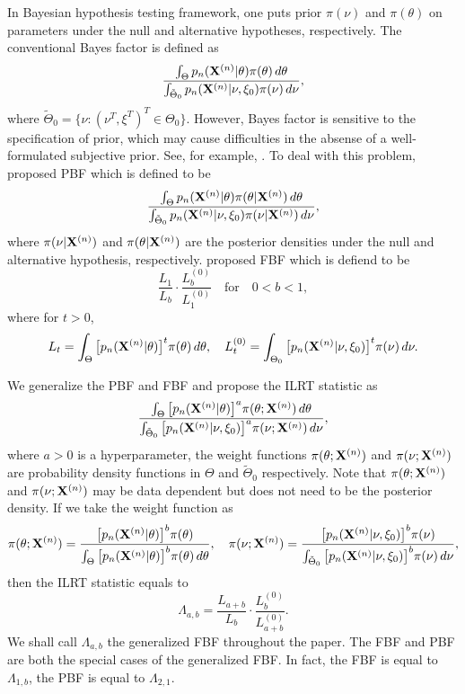\documentclass[11pt]{article}
\theoremstyle{plain}
\theoremstyle{definition}
\theoremstyle{remark}
\begin{document}
In Bayesian hypothesis testing framework, one puts prior $\pi(\nu)$ and $\pi(\theta)$ on parameters under the null and alternative hypotheses, respectively.
The conventional Bayes factor is defined as
\begin{equation*}
  \frac{\int_{\Theta} p_n(\mathbf{X}^{(n)}|\theta)\pi(\theta)\, d\theta}
    {\int_{\tilde{\Theta}_0}p_n(\mathbf{X}^{(n)}|\nu,\xi_0)\pi(\nu)\, d\nu},
\end{equation*}
where $\tilde{\Theta}_0=\{\nu: (\nu^T,\xi^T)^T\in \Theta_0\}$.
However, Bayes factor is sensitive to the specification of prior, which may cause difficulties in the absense of a well-formulated subjective prior. See, for example, \cite{Lindley1982}.
To deal with this problem,~\cite{Aitkin1991Posterior} proposed PBF which is defined to be
\begin{equation*}
    \frac{\int_{\Theta} p_n(\mathbf{X}^{(n)}|\theta)\pi(\theta|\mathbf{X}^{(n)})\, d\theta}{\int_{\tilde{\Theta}_0}p_n(\mathbf{X}^{(n)}|\nu,\xi_0)\pi(\nu|\mathbf{X}^{(n)})\, d\nu},
\end{equation*}
where $\pi(\nu|\mathbf{X}^{(n)})$ and $\pi(\theta|\mathbf{X}^{(n)})$ are the posterior densities under the null and alternative hypothesis, respectively.
\cite{Fractional1995} proposed  FBF which is defiend to be
\begin{equation*}
    \frac{L_{1}}{L_{b}}\cdot \frac{L_{b}^{(0)}}{L_{1}^{(0)}}\quad \text{for}\quad 0<b<1,
\end{equation*}
where for $t>0$,
 $$
 L_t=\int_{\Theta}\big[p_n(\mathbf{X}^{(n)}|\theta)\big]^t \pi(\theta)\, d\theta,\quad
 L_t^{(0)}=\int_{\Theta_0}\big[p_n(\mathbf{X}^{(n)}|\nu,\xi_0)\big]^t \pi(\nu)\, d\nu.
 $$

We generalize the PBF and FBF and propose the ILRT statistic as
\begin{equation*}
    \frac{\int_{\Theta} \big[p_n(\mathbf{X}^{(n)}|\theta)\big]^{a}\pi(\theta;\mathbf{X}^{(n)})\,d\theta}{\int_{\tilde{\Theta}_0} \big[p_n(\mathbf{X}^{(n)}|\nu,\xi_0)\big]^{a}\pi(\nu;\mathbf{X}^{(n)})\,d\nu},
\end{equation*}
where $a>0$ is a hyperparameter,
 the weight functions $\pi(\theta;\mathbf{X}^{(n)})$ and $\pi(\nu;\mathbf{X}^{(n)})$ are probability density functions in $\Theta$ and $\tilde{\Theta}_0$ respectively.
Note that $\pi(\theta;\mathbf{X}^{(n)})$ and $\pi(\nu;\mathbf{X}^{(n)})$ may be data dependent but does not need to be the posterior density.
If we take the weight function as
\begin{equation}\label{firstWeight}
\pi(\theta;\mathbf{X}^{(n)})=\frac{\big[p_n(\mathbf{X}^{(n)}|\theta)\big]^b \pi(\theta)}{\int_{\Theta}\big[p_n(\mathbf{X}^{(n)}|\theta)\big]^b \pi(\theta)\, d\theta},
\quad
\pi(\nu;\mathbf{X}^{(n)})=\frac{\big[p_n(\mathbf{X}^{(n)}|\nu,
    \xi_0)\big]^b \pi(\nu)}{\int_{\tilde{\Theta}_0}\big[p_n(\mathbf{X}^{(n)}|\nu,\xi_0)\big]^b \pi(\nu)\, d\nu},
\end{equation}
then the ILRT statistic equals to
$$
    \Lambda_{a,b}=
    \frac{L_{a+b}}{L_{b}}\cdot \frac{L_{b}^{(0)}}{L_{a+b}^{(0)}}.
$$
We shall call $\Lambda_{a,b}$ the generalized FBF throughout the paper.
The FBF and PBF are both the special cases of the generalized FBF.
In fact, the FBF is equal to $\Lambda_{1,b}$, the PBF is equal to $\Lambda_{2,1}$.
\end{document}
